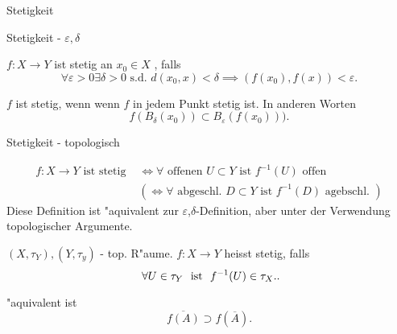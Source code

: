 \documentclass[class=article, crop=false]{standalone}
\begin{document}
\begin{zettel}{Stetigkeit}
\begin{flashcard}[]{}

	\begin{question}
		Stetigkeit - $\varepsilon, \delta $
	\end{question}

	\begin{definition}[Stetigkeit]
		$f:X \longrightarrow Y$ ist stetig an $x_0 \in  X$ , falls
		\[
			\forall \varepsilon >  0 \exists  \delta  > 0 \text{ s.d. }  d (x_0 , x) < \delta \implies (f (x_0), f (x)) <  \varepsilon
		.\]

		$f$ ist stetig, wenn wenn $f$ in jedem Punkt stetig ist.
		In anderen Worten
		\[
			f (B_{\delta }(x_0)) \subset B_{\varepsilon } (f (x_0)) ).
		\]
	\end{definition}
\end{flashcard}

\begin{flashcard}[]{}
	\begin{question}
		Stetigkeit - topologisch
	\end{question}
	\begin{definition}[Stetigkeit]
		\begin{align*}
			f:X \longrightarrow Y \text{ ist stetig } & \iff \forall \text{ offenen } U \subset Y \text{ ist } f^{-1} (U) \text{ offen }            \\
			                                          & ( \iff \forall  \text{ abgeschl. } D \subset Y \text{ ist } f^{-1} (D) \text{ agebschl. } )
		\end{align*}
		Diese Definition ist "aquivalent zur $\varepsilon $,$\delta$-Definition, aber unter der Verwendung topologischer Argumente.
	\end{definition}
\end{flashcard}

\begin{definition}[Stetigkeit]
	$(X, \tau_Y), (Y, \tau_y)$  - top. R"aume. $f:X \longrightarrow Y$ heisst stetig, falls
	\[
		\forall U \in  \tau_Y \tx{ ist } f^{-1} (U) \in  \tau_X.
	.\]
\end{definition}

"aquivalent ist
\[
	\overline{f(A)} \supset f (\overline{A})
.\]

\end{zettel}
\end{document}
